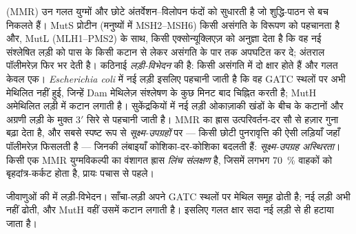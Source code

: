 \begin{definition}[असंगति मरम्मत]\label{def:b3:dna-repair:mmr}
\emph{} (MMR) उन गलत युग्मों और छोटे
अंतर्वेशन--विलोपन फंदों को सुधारती है जो शुद्धि-पाठन से बच निकलते हैं।
MutS प्रोटीन (मनुष्यों में MSH2--MSH6) किसी असंगति के विरूपण को
पहचानता है और, MutL (MLH1--PMS2) के साथ, किसी एक्सोन्यूक्लिएज़ को
अनुज्ञा देता है कि वह नई संश्लेषित लड़ी को पास के किसी कटान से लेकर
असंगति के पार तक अपघटित कर दे; अंतराल पॉलीमरेज़ फिर भर देती है।
कठिनाई \emph{लड़ी-विभेदन} की है: किसी असंगति में दो क्षार होते हैं और
गलत केवल एक। \emph{Escherichia coli} में नई लड़ी इसलिए पहचानी जाती है
कि वह GATC स्थलों पर अभी मेथिलित नहीं हुई, जिन्हें Dam मेथिलेज़
संश्लेषण के कुछ मिनट बाद चिह्नित करती है; MutH अमेथिलित लड़ी में कटान
लगाती है। सुकेंद्रकियों में नई लड़ी ओकाज़ाकी खंडों के बीच के कटानों और
अग्रणी लड़ी के मुक्त 3$'$ सिरे से पहचानी जाती है। MMR का ह्रास
उत्परिवर्तन-दर सौ से हज़ार गुना बढ़ा देता है, और सबसे स्पष्ट रूप से
\emph{सूक्ष्म-उपग्रहों} पर --- किसी छोटी पुनरावृत्ति की ऐसी लड़ियाँ जहाँ
पॉलीमरेज़ फिसलती है --- जिनकी लंबाइयाँ कोशिका-दर-कोशिका बदलती हैं:
\emph{सूक्ष्म-उपग्रह अस्थिरता}। किसी एक MMR युग्मविकल्पी का वंशागत ह्रास
\emph{लिंच संलक्षण} है, जिसमें लगभग \qty{70}{\%} वाहकों को
बृहदांत्र-कर्कट होता है, प्रायः पचास से पहले।
\end{definition}

\begin{omfigure}

{\small जीवाणुओं की  में लड़ी-विभेदन। साँचा-लड़ी अपने GATC
स्थलों पर मेथिल समूह ढोती है; नई लड़ी अभी नहीं ढोती, और MutH वहीं उसमें
कटान लगाती है। इसलिए गलत क्षार सदा नई लड़ी से ही हटाया जाता है।}
\end{omfigure}

